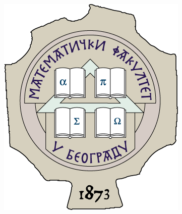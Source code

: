 \documentclass{article}
\begin{document}
\begin{center}
\begin{minipage}{.16\linewidth}
    \includegraphics[width=.7\linewidth]{media/images/grb.png}
    ~\vfill
    ~\vfill
  \end{minipage}
\end{center}

\vspace{2cm}

\fontsize{30}{36}\selectfont
\setlength{\columnsep}{1cm}
\end{document}
